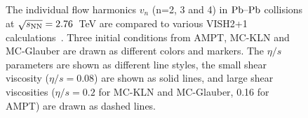 \begin{figure}[h]
\begin{center}
        \caption{The individual flow harmonics $v_n$ (n=2, 3 and 4) in $\textnormal{Pb--Pb}$ collisions at $\sqrt{s_{\textnormal{NN}}}=2.76$~TeV are compared to various VISH2+1 calculations~\cite{Zhu:2016puf}. Three initial conditions from AMPT, MC-KLN and MC-Glauber are drawn as different colors and markers. The $\eta/s$ parameters are shown as different line styles, the small shear viscosity ($\eta/s=0.08$) are shown as solid lines, and large shear viscosities ($\eta/s=0.2$ for MC-KLN and MC-Glauber, 0.16 for AMPT) are drawn as dashed lines.}
        \label{fig:Figure_9}
              \end{center}
\end{figure}
